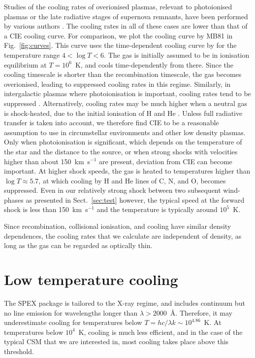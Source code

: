 \documentclass[floatfix,traditabstract,preprint2]{aa}
\begin{document}
Studies of the cooling rates of over\-ionised plasmas, relevant to photo\-ionised plasmas or the late radiative stages of supernova remnants, have been performed by various authors \citep[e.g.,][]{1973Kafatos, 1976ShapiroMoore, 1993SutherlandDopita}. The cooling rates in all of these cases are lower than that of a CIE cooling curve.  For comparison, we plot the cooling curve by MB81 in Fig.~\ref{fig:curves}. This curve uses the time-dependent cooling curve by \citet{1976ShapiroMoore} for the temperature range $4 < \log T < 6$. The gas is initially assumed to be in ionisation equilibrium at $T=10^6$~K, and cools time-dependently from there. Since the cooling timescale is shorter than the recombination timescale, the gas becomes over\-ionised, leading to suppressed cooling rates in this regime. Similarly, in intergalactic plasmas where photo\-ionisation is important, cooling rates tend to be suppressed  \citep{2009Wiersmaetal}. Alternatively, cooling rates may be much higher when a neutral gas is shock-heated, due to the initial ionisation of H and He \citep{1985CoxRaymond}. 
 Unless full radiative transfer is taken into account, we therefore find CIE to be a reasonable assumption to use in circumstellar environments and other low density plasmas. Only when photo\-ionisation is significant, which depends on the temperature of the star and the distance to the source, or when strong shocks with velocities higher than about 150~km~s$^{-1}$ are present, deviation from CIE can become important. At higher shock speeds, the gas is heated to temperatures higher than $\log T \approx 5.7$, at which cooling by H and He lines of C, N, and O, becomes suppressed. Even in our relatively strong shock between two subsequent wind-phases as presented in Sect.~\ref{sec:test} however, the typical speed at the forward shock is less than 150~km~s$^{-1}$ and the temperature is typically around $10^5$~K. 

  
Since recombination, collisional ionisation, and cooling have similar density dependences, the cooling rates that we calculate are independent of density, as long as the gas can be regarded as optically thin.

\section{Low temperature cooling}
\label{sec:DMcooling}
The SPEX package is tailored to the X-ray regime, and includes continuum but no line emission for wavelengths longer than $\lambda>2000$~\AA. Therefore, it may underestimate cooling for temperatures below $T=hc/\lambda k \sim10^{4.86}$~K. At temperatures below $10^4$~K, cooling is much less efficient, and in the case of the typical CSM that we are interested in, most cooling takes place above this threshold. 
\end{document}

